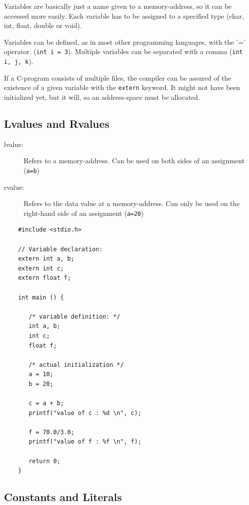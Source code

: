 \documentclass[a4paper, 11pt]{article}
\newcommand{\code}[1]{\texttt{#1}}
\begin{document}
\begin{minipage}{0.50\textwidth}
    Variables are basically just a name given to a memory-address, so it can be accessed more easily. Each variable has to be assigned to a specified type (char, int, float, double or void). 

    Variables can be defined, as in most other programming languages, with the '=' operator. (\code{int i = 3}). Multiple variables can be separated with a comma (\code{int i, j, k}). 

    If a C-program consists of multiple files, the compiler can be assured of the existence of a given variable with the \code{extern} keyword. It might not have been initialized yet, but it will, so an address-space must be allocated. 

    \subsection{Lvalues and Rvalues}

    \begin{description}
        \item[lvalue: ] Refers to a memory-address. Can be used on both sides of an assignment (\code{a=b})
        \item[rvalue: ] Refers to the data value at a memory-address. Can only be used on the right-hand side of an assignment (\code{a=20})
    \end{description}
\end{minipage}\hfill
\begin{minipage}{0.45\textwidth}
    \begin{verbatim}
    #include <stdio.h>

    // Variable declaration:
    extern int a, b;
    extern int c;
    extern float f;

    int main () {

       /* variable definition: */
       int a, b;
       int c;
       float f;

       /* actual initialization */
       a = 10;
       b = 20;

       c = a + b;
       printf("value of c : %d \n", c);

       f = 70.0/3.0;
       printf("value of f : %f \n", f);

       return 0;
    }
    \end{verbatim}
\end{minipage}

\subsection{Constants and Literals}
\end{document}
